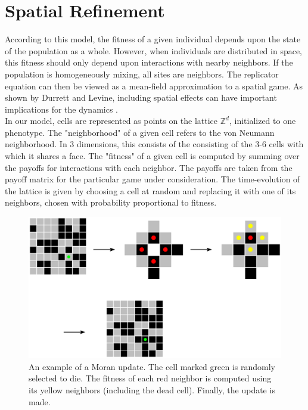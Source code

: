 \documentclass[12pt]{report}
\begin{document}
\section*{Spatial Refinement}

According to this model, the fitness of a given individual depends upon the state of the population as a whole. However, when individuals are distributed in space, this fitness should only depend upon interactions with nearby neighbors. If the population is homogeneously mixing, all sites are neighbors. The replicator equation can then be viewed as a mean-field approximation to a spatial game. As shown by Durrett and Levine, including spatial effects can have important implications for the dynamics \cite{Durrett1994}.\\

In our model, cells are represented as points on the lattice $\mathbb{Z}^d$, initialized to one phenotype. The "neighborhood" of a given cell refers to the von Neumann neighborhood. In 3 dimensions, this consists of the consisting of the 3-6 cells with which it shares a face. The "fitness" of a given cell is computed by summing over the payoffs for interactions with each neighbor. The payoffs are taken from the payoff matrix for the particular game under consideration. The time-evolution of the lattice is given by choosing a cell at random and replacing it with one of its neighbors, chosen with probability proportional to fitness.
\begin{figure}
\centering
\includegraphics[width = \linewidth]{Diagrams/General/themodel}
\caption{An example of a Moran update. The cell marked green is randomly selected to die. The fitness of each red neighbor is computed using its yellow neighbors (including the dead cell). Finally, the update is made.}
\end{figure}
\end{document}
